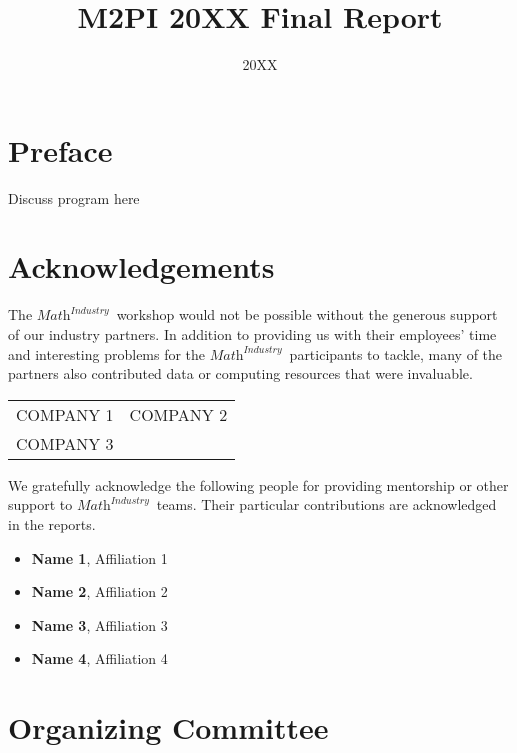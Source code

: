 \documentclass[11pt]{report}
\title{M2PI 20XX Final Report}
\author{}
\date{20XX}
\begin{document}
\newcommand{\mtopi}{$\textit{Math}^\textit{Industry}$~}
\newcommand{\person}[2]{\textbf{#1}, #2}
\sectionfont{\centering\sc\MakeLowercase}

\maketitle

\section*{Preface}
    Discuss program here

\section*{Acknowledgements}
The \mtopi workshop would not be possible without
the generous support of our industry partners. In addition to providing us with
their employees' time and interesting problems for the
\mtopi participants to tackle, many of the partners
also contributed data or computing resources that were invaluable.

\noindent\hrulefill

 \begin{tabularx}{\textwidth}{ X X }
     \uppercase{Company 1} &
     \uppercase{Company 2} \\
     \uppercase{Company 3} &
 \end{tabularx}

\noindent\hrulefill

We gratefully acknowledge the following people for providing mentorship or
other support to \mtopi teams. Their particular contributions are acknowledged
in the reports.

\noindent\hrulefill

\begin{multicols}{2}
    \begin{itemize}
        \item[] \person{Name 1}{Affiliation 1}
        \item[] \person{Name 2}{Affiliation 2}
        \item[] \person{Name 3}{Affiliation 3}
        \item[] \person{Name 4}{Affiliation 4}
    \end{itemize}
\end{multicols}


\section*{Organizing Committee}
\end{document}
